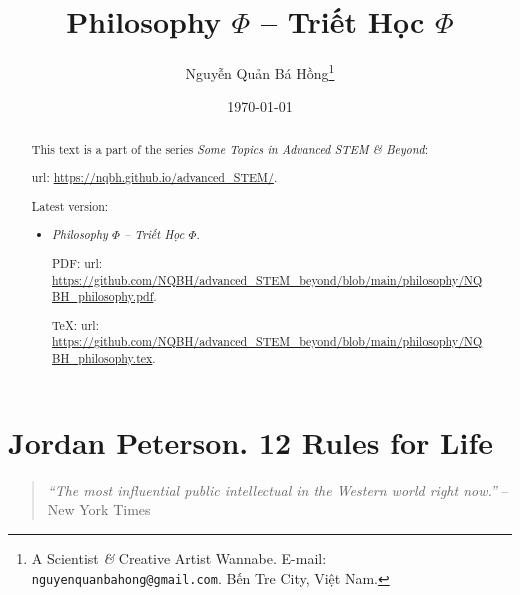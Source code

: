 \documentclass{article}
\title{Philosophy $\Phi$ -- Triết Học $\Phi$}
\author{Nguyễn Quản Bá Hồng\footnote{A Scientist {\it\&} Creative Artist Wannabe. E-mail: {\tt nguyenquanbahong@gmail.com}. Bến Tre City, Việt Nam.}}
\date{\today}
\begin{document}
\maketitle
\begin{abstract}
	This text is a part of the series {\it Some Topics in Advanced STEM \& Beyond}:
	
	{\sc url}: \url{https://nqbh.github.io/advanced_STEM/}.
	
	Latest version:
	\begin{itemize}
		\item {\it Philosophy $\Phi$ -- Triết Học $\Phi$}.
		
		PDF: {\sc url}: \url{https://github.com/NQBH/advanced_STEM_beyond/blob/main/philosophy/NQBH_philosophy.pdf}.
		
		\TeX: {\sc url}: \url{https://github.com/NQBH/advanced_STEM_beyond/blob/main/philosophy/NQBH_philosophy.tex}.
	\end{itemize}
\end{abstract}
\tableofcontents


\section{Jordan Peterson. 12 Rules for Life}

\begin{quotation}
	\textit{``The most influential public intellectual in the Western world right now.''} -- New York Times
\end{quotation}
\end{document}
